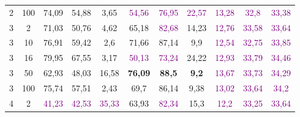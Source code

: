 \begin{table}[ht]
\begin{tabular}{cc|ccc|ccc|ccc}
        {2}                           & {100}  & {74,09}                             & {54,88}                             & {3,65}                                   & \textcolor{purple}{54,56} & \textcolor{purple}{76,95} & \textcolor{purple}{22,57} & \textcolor{purple}{13,28} & \textcolor{purple}{32,8}  & \textcolor{purple}{33,38} \\
        {3}                           & {2}    & {71,03}                             & {50,76}                             & {4,62}                                   & {65,18}                   & \textcolor{purple}{82,68} & {14,23}                   & \textcolor{purple}{12,76} & \textcolor{purple}{33,58} & \textcolor{purple}{33,64} \\
        {3}                           & {10}   & {76,91}                             & {59,42}                             & {2,6}                                    & {71,66}                   & {87,14}                   & {9,9}                     & \textcolor{purple}{12,54} & \textcolor{purple}{32,75} & \textcolor{purple}{33,85} \\
        {3}                           & {16}   & {79,95}                             & {67,55}                             & {3,17}                                   & \textcolor{purple}{50,13} & \textcolor{purple}{73,24} & {24,22}                   & \textcolor{purple}{12,93} & \textcolor{purple}{33,79} & \textcolor{purple}{34,46} \\
        {3}                           & {50}   & {62,93}                             & {48,03}                             & {16,58}                                  & {\textbf{76,09}}          & {\textbf{88,5}}           & \textbf{9,2}              & \textcolor{purple}{13,67} & \textcolor{purple}{33,73} & \textcolor{purple}{34,29} \\
        {3}                           & {100}  & {75,74}                             & {57,51}                             & {2,43}                                   & {69,7}                    & {86,14}                   & {9,38}                    & \textcolor{purple}{13,02} & \textcolor{purple}{33,64} & \textcolor{purple}{34,2}  \\
        {4}                           & {2}    & \textcolor{purple}{41,23}           & \textcolor{purple}{42,53}           & \textcolor{purple}{35,33}                & {63,93}                   & \textcolor{purple}{82,34} & {15,3}                    & \textcolor{purple}{12,2}  & \textcolor{purple}{33,25} & \textcolor{purple}{33,64} \\

\end{tabular}
\end{table}
